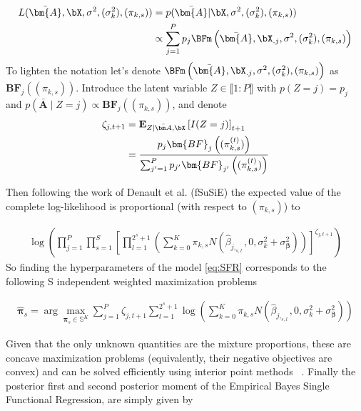 \begin{align}\label{eq:like_SFR3_pi_sig0}
    L(\bar{\bm{A}},\bX,  \sigma^2  , (\sigma^2_k),(\pi_{k,s}) )& =p(\bar{\bm{A}}|\bX, \sigma^2  , (\sigma^2_k),(\pi_{k,s}) )\\
    &   \propto \sum_{j=1}^P p_j   \BFm\left( \bar{\bm{A}}, \bX_{.j}, \sigma^2, (\sigma^2_k) ,  (\pi_{k,s})   \right)
\end{align}
 To lighten the notation let's denote $ \BFm\left( \bar{\bm{A}}, \bX_{.j}, \sigma^2, (\sigma^2_k) ,  (\pi_{k,s})   \right) $ as  $\bm{BF}_j\left(    (\pi_{k,s})   \right)$. Introduce the latent variable $Z\in\llbracket 1:P\rrbracket$ with $p(Z=j)=p_j$ and $p(\bar{\bm A}\mid Z=j)\propto\bm{BF}_j((\pi_{k,s}))$, and denote
\begin{align}
 \zeta_{j,t+1} &=\mathbf{E}_{Z|\bar{\bm A},\bX} \left[I(Z=j) \right]_{t+1}\\
 &= \frac{ p_j \bm{BF}_j\left(    (\pi^{(t)}_{k,s})   \right) }{ \sum_{j'=1}^P p_{j'}   \bm{BF}_{j'}\left(    (\pi^{(t)}_{k,s})   \right)}
\end{align}
 

Then following the work of Denault et al.  (fSuSiE)  the expected value of the complete log-likelihood is   proportional (with respect to $ (\pi_{k,s})  $) to

\begin{align}
  \log\left(  \prod_{j=1}^P\prod_{s=1}^S \left[ \prod_{ l=1}^{2^s+1} \left( \sum_{k=0}^K \pi_{k,s}  N(\hat{\beta} _{j,_{s,l}},0,\sigma_k^2+\sigma_{ \bm{\beta}}^2) \right) \right]^{\zeta_{j,t+1}}\right)
\end{align}
So finding the hyperparameters of the model \ref{eq:SFR} corresponds to the following  S independent weighted maximization problems
 
 \begin{align}
\label{eq:S_weigthed_ash_pb} 
    \hat{\bm{\pi}}_s = \arg\max_{\bm{\pi}_s \in \mathbb{S}^K}
    \sum_{j=1}^P\zeta_{j,t+1}\sum_{l=1}^{2^s+1}
    \log\!\left(\sum_{k=0}^K \pi_{k,s}N(\hat{\beta}_{j,_{s,l}},0,\sigma_k^2+\sigma_{\bm{\beta}}^2)\right)
 \end{align}
 
 
 Given that the only unknown quantities are the mixture proportions, these are concave maximization problems (equivalently, their negative objectives are convex) and can be solved efficiently using interior point methods ~\citep{kim_fast_2019}.  Finally the posterior first and second posterior moment of the  Empirical Bayes Single Functional Regression, are  simply given by

